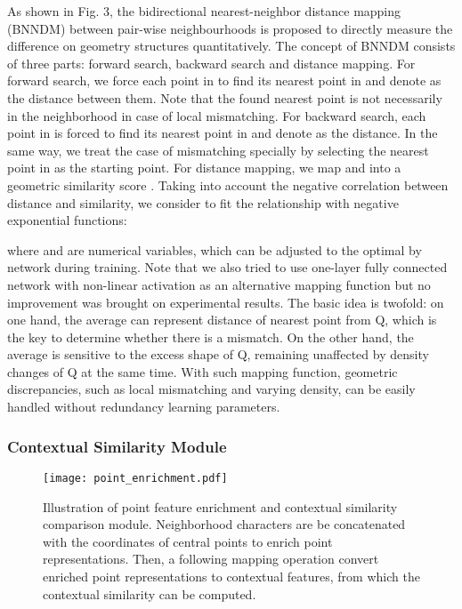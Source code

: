 \documentclass[letterpaper, 10 pt, conference]{ieeeconf}
\begin{document}
As shown in Fig. 3, the bidirectional nearest-neighbor distance mapping (BNNDM) between pair-wise neighbourhoods is proposed to directly measure the difference on geometry structures quantitatively. The concept of BNNDM consists of three parts: forward search, backward search and distance mapping. For forward search, we force each point in  to find its nearest point in  and denote   as the distance between them. Note that the found nearest point is not necessarily in the neighborhood in case of local mismatching. For backward search, each point in  is forced to find its nearest point in  and denote  as the distance. In the same way, we treat the case of mismatching specially by selecting the nearest point in  as the starting point. For distance mapping, we map  and  into a geometric similarity score . Taking into account the negative correlation between distance and similarity, we consider to fit the relationship with negative exponential functions:



where  and  are numerical variables, which can be adjusted to the optimal by network during training. Note that we also tried to use one-layer fully connected network with non-linear activation as an alternative mapping function but no improvement was brought on experimental results. 
The basic idea is twofold: on one hand, the average  can represent distance of nearest point from Q, which is the key to determine whether there is a mismatch. On the other hand, the average  is sensitive to the excess shape of Q, remaining unaffected by density changes of Q at the same time.
With such mapping function, geometric discrepancies, such as local mismatching and varying density, can be easily handled without redundancy learning parameters.

\subsubsection{\textbf{Contextual Similarity Module}}

\begin{figure}[t]


    \centering
    \texttt{[image: point\_enrichment.pdf]}
    \vspace{-2mm}
    \caption{Illustration of point feature enrichment and contextual similarity comparison module. Neighborhood characters are be concatenated with the coordinates of central points to enrich point representations. Then, a following mapping operation convert enriched point representations to contextual features, from which the contextual similarity can be computed.} 
    \vspace{-5mm}
\end{figure}
\end{document}
